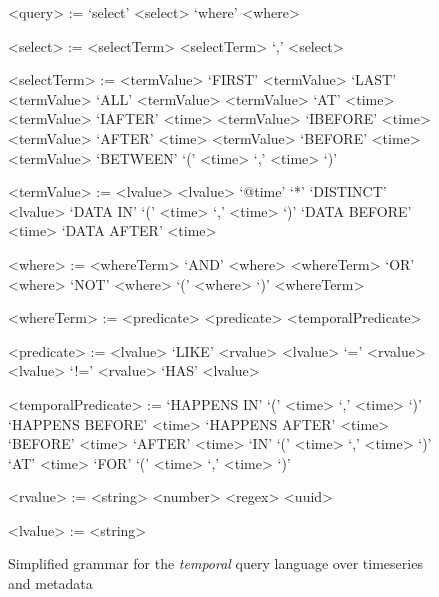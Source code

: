 \setlength{\grammarindent}{8em}
\setlength{\grammarparsep}{4pt}
\begin{figure}
\centering
\begin{grammar}
<query> := `select' <select> `where' <where>

<select> := <selectTerm>
\alt <selectTerm> `,' <select>

<selectTerm> := <termValue>
\alt `FIRST' <termValue>
\alt `LAST' <termValue>
\alt `ALL' <termValue>
\alt <termValue> `AT' <time>
\alt <termValue> `IAFTER' <time>
\alt <termValue> `IBEFORE' <time>
\alt <termValue> `AFTER' <time>
\alt <termValue> `BEFORE' <time>
\alt <termValue> `BETWEEN' `(' <time> `,' <time> `)'

<termValue> := <lvalue>
\alt <lvalue> `@time'
\alt `*'
\alt `DISTINCT' <lvalue>
\alt `DATA IN' `(' <time> `,' <time> `)'
\alt `DATA BEFORE' <time>
\alt `DATA AFTER' <time>

<where> := <whereTerm> `AND' <where>
\alt <whereTerm> `OR' <where>
\alt `NOT' <where>
\alt `(' <where> `)'
\alt <whereTerm>

<whereTerm> := <predicate>
\alt <predicate> <temporalPredicate>

<predicate> := <lvalue> `LIKE' <rvalue>
\alt <lvalue> `=' <rvalue>
\alt <lvalue> `!=' <rvalue>
\alt `HAS' <lvalue>

<temporalPredicate> := `HAPPENS IN' `(' <time> `,' <time> `)'
\alt `HAPPENS BEFORE' <time>
\alt `HAPPENS AFTER' <time>
\alt `BEFORE' <time>
\alt `AFTER' <time>
\alt `IN' `(' <time> `,' <time> `)'
\alt `AT' <time>
\alt `FOR' `(' <time> `,' <time> `)'

<rvalue> := <string>
\alt <number>
\alt <regex>
\alt <uuid>

<lvalue> := <string>
\end{grammar}
\caption{Simplified grammar for the \emph{temporal} query language over timeseries and metadata}
\label{fig:temporalgrammar}
\end{figure}


